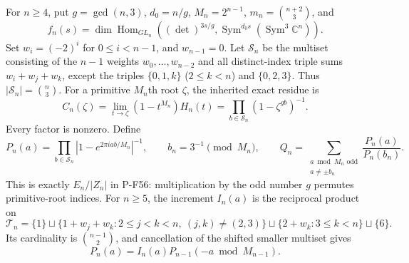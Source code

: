 For $n\ge4$, put $g=\gcd(n,3)$, $d_0=n/g$, $M_n=2^{n-1}$,
$m_n=\binom{n+2}{3}$, and
\[
 f_n(s)=\dim\operatorname{Hom}_{GL_n}
  ((\det)^{3s/g},\operatorname{Sym}^{d_0s}(\operatorname{Sym}^3\mathbb C^n)).
\]
Set $w_i=(-2)^i$ for $0\le i<n-1$, and $w_{n-1}=0$.
Let $\mathcal S_n$ be the multiset consisting of the $n-1$ weights
$w_0,\ldots,w_{n-2}$ and all distinct-index triple sums
$w_i+w_j+w_k$, except the triples $\{0,1,k\}$ ($2\le k<n$)
and $\{0,2,3\}$.  Thus $|\mathcal S_n|=\binom n3$.
For a primitive $M_n$th root $\zeta$, the inherited exact residue is
\[
 C_n(\zeta)=\lim_{t\to\zeta}(1-t^{M_n})H_n(t)
       =\prod_{b\in\mathcal S_n}(1-\zeta^{gb})^{-1}.
 \tag{PNEW-R}
\]
Every factor is nonzero.  Define
\[
 P_n(a)=\prod_{b\in\mathcal S_n}|1-e^{2\pi iab/M_n}|^{-1},
 \qquad b_n=3^{-1}\pmod {M_n},
 \qquad
 Q_n=\sum_{\substack{a\bmod M_n\text{ odd}\\a\ne\pm b_n}}
            \frac{P_n(a)}{P_n(b_n)}.
\]
This is exactly $E_n/|Z_n|$ in P-F56: multiplication by the odd
number $g$ permutes primitive-root indices.  For $n\ge5$, the
increment $I_n(a)$ is the reciprocal product on
\[
 \mathcal T_n=\{1\}\sqcup
 \{1+w_j+w_k:2\le j<k<n,\ (j,k)\ne(2,3)\}
 \sqcup\{2+w_k:3\le k<n\}\sqcup\{6\}.
\]
Its cardinality is $\binom{n-1}{2}$, and cancellation of the shifted
smaller multiset gives
\[
 P_n(a)=I_n(a)P_{n-1}(-a\bmod M_{n-1}).
 \tag{PNEW-rec}
\]

